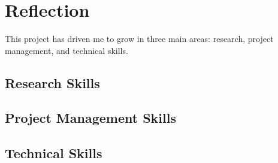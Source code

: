 \chapter{Reflection} 

This project has driven me to grow in three main areas: research, project management, 
and technical skills.

\section{Research Skills}

\section{Project Management Skills}

\section{Technical Skills}
